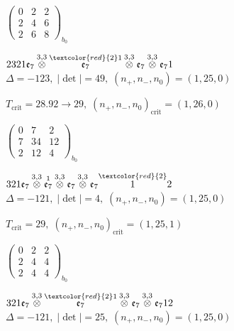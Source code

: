 \documentclass[10pt]{article}
\begin{document}
\hspace{2em}$\left(\begin{smallmatrix}0 & 2 & 2 \\ 2 & 4 & 6 \\ 2 & 6 & 8\end{smallmatrix}\right)_{\!b_0}$

\smallskip

$2321\mathfrak{e}_7\overset{3,3}{\otimes}\overset{\textcolor{red}{2}1}{\mathfrak{e}_7}\overset{3,3}{\otimes}\mathfrak{e}_7\overset{3,3}{\otimes}\mathfrak{e}_71$ \quad $\Delta=-123,\; |\det|=49,\; (n_+,n_-,n_0)=(1,25,0)$

\hspace{1em}$T_{\text{crit}}=28.92 \to 29,\; (n_+,n_-,n_0)_{\text{crit}}=(1,26,0)$

\hspace{2em}$\left(\begin{smallmatrix}0 & 7 & 2 \\ 7 & 34 & 12 \\ 2 & 12 & 4\end{smallmatrix}\right)_{\!b_0}$

\smallskip

$321\mathfrak{e}_7\overset{3,3}{\otimes}\overset{1}{\mathfrak{e}_7}\overset{3,3}{\otimes}\mathfrak{e}_7\overset{3,3}{\otimes}\mathfrak{e}_7\overset{\textcolor{red}{2}}{1}2$ \quad $\Delta=-121,\; |\det|=4,\; (n_+,n_-,n_0)=(1,25,0)$

\hspace{1em}$T_{\text{crit}}=29,\; (n_+,n_-,n_0)_{\text{crit}}=(1,25,1)$

\hspace{2em}$\left(\begin{smallmatrix}0 & 2 & 2 \\ 2 & 4 & 4 \\ 2 & 4 & 4\end{smallmatrix}\right)_{\!b_0}$

$321\mathfrak{e}_7\overset{3,3}{\otimes}\overset{\textcolor{red}{2}1}{\mathfrak{e}_7}\overset{3,3}{\otimes}\mathfrak{e}_7\overset{3,3}{\otimes}\mathfrak{e}_712$ \quad $\Delta=-121,\; |\det|=25,\; (n_+,n_-,n_0)=(1,25,0)$
\end{document}

